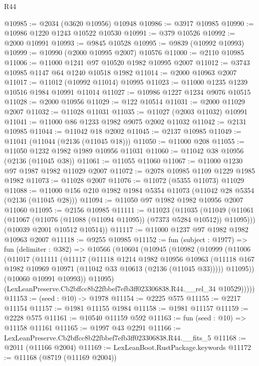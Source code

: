 \begin{lexlean}{R44}
\begin{coremodule}
@10985 := @2034 (@3620 @10956) @10948
@10986 := @3917 @10985
@10990 := @10986 @1220 @1243 @10522 @10530
@10991 := @379 @10526
@10992 := @2000 @10991
@10993 := @9845 @10528
@10995 := @9839 (@10992 @10993)
@10999 := @10990 (@2000 @10995 @2007) @10576
@11000 := @2110 @10985
@11006 := @11000 @1241 @97 @10520 @1982 @10995 @2007
@11012 := @3743 @10985 @1147 @64 @1240 @10518 @1982
@11014 := @2000 @10963 @2007
@11017 := @11012 (@10992 @11014) @10995
@11023 := @11000 @1235 @1239 @10516 @1984 @10991 @11014
@11027 := @10986 @1227 @1234 @9076 @10515
@11028 := @2000 @10956
@11029 := @122 @10514
@11031 := @2000 @11029 @2007
@11032 := @11028 @11031
@11035 := @11027 (@2003 @11032) @10991
@11041 := @11000 @86 @1233 @1982 @9075 @2002 @11032
@11042 := @2131 @10985
@11044 := @11042 @18 @2002
@11045 := @2137 @10985
@11049 := @11041 (@11044 (@2136 (@11045 @18)))
@11050 := @11000 @208
@11055 := @11050 @1232 @1982 @1989 @10956 @11031
@11060 := @11042 @38 @10956 (@2136 (@11045 @38))
@11061 := @11055 @11060
@11067 := @11000 @1230 @97 @1987 @1982 @11029 @2007
@11072 := @2078 @10985 @1109 @1229 @1985 @1982
@11073 := @11028 @2007
@11076 := @11072 (@5355 @11073) @11029
@11088 := @11000 @156 @210 @1982 @1984 @5354 @11073 (@11042 @28 @5354 (@2136 (@11045 @28)))
@11094 := @11050 @97 @1982 @1982 @10956 @2007 @11060
@11095 := @2156 @10985
@11111 := @11023
    (@11035
      (@11049 (@11061 (@11067 (@11076 (@11088 (@11094 @11095)) (@7373 @5284 @10512)) @11095)))
      (@10039 @2001 @10512 @10514))
@11117 := @11000 @1237 @97 @1982 @1982 @10963 @2007
@11118 := @9255 @10985
@11152 := fun (subject : @1977) =>
  fun (delimiter : @382) =>
  @10566
    (@10604
      (@10945
        (@10982
          (@10999
            (@11006
              (@11017
                (@11111
                  (@11117
                    (@11118
                      @1214
                      @1982
                      @10956
                      @10963
                      (@11118 @167 @1982 @10969 @10971 (@11042 @33 @10613 (@2136 (@11045 @33)))))
                    @11095))
                (@10060 @10991 @10993))
              @11095)
            (LexLeanPreserve.Cb2bffcc8b22fbbef7efb3ff023306838.R44.__rel_34 @10529)))))
@11153 := (seed : @10) -> @1978
@11154 := @2225 @575
@11155 := @2217 @11154
@11157 := @1981 @11155 @1984
@11158 := @1981 @11157
@11159 := @2228 @575
@11161 := @10540 @11159 @592
@11163 := fun (seed : @10) => @11158 @11161
@11165 := @1997 @43 @2291
@11166 := LexLeanPreserve.Cb2bffcc8b22fbbef7efb3ff023306838.R44.__fits_5
@11168 := @2011 (@11166 @2004)
@11169 := LexLeanBoot.RustPackage.keywords
@11172 := @11168 (@8719 (@11169 @2004))

\end{coremodule}
\end{lexlean}
